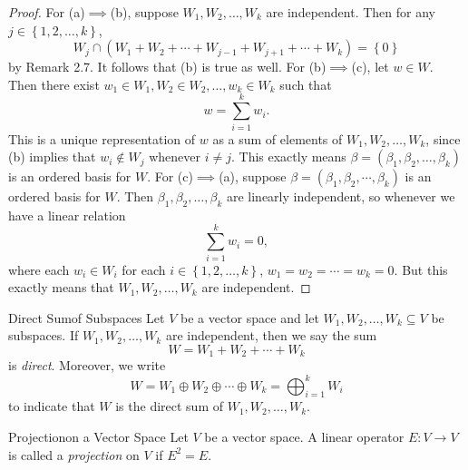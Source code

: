 \documentclass[math_245.tex]{subfiles}
\begin{document}
    \begin{proof}
        For (a)$\implies$(b), suppose $W_1, W_2, \ldots, W_k$ are independent. Then for any $j\in \left\lbrace 1, 2, \ldots, k \right\rbrace$, 
        \begin{equation*}
            W_j\cap \left( W_1+W_2+\cdots+W_{j-1}+W_{j+1}+\cdots+W_k \right) = \left\lbrace 0 \right\rbrace 
        \end{equation*}
        by Remark 2.7. It follows that (b) is true as well. For (b)$\implies$(c), let $w\in W$. Then there exist $w_1\in W_1, W_2\in W_2, \ldots, w_k\in W_k$ such that
        \begin{equation*}
            w = \sum^{k}_{i=1} w_i.
        \end{equation*}
        This is a unique representation of $w$ as a sum of elements of $W_1, W_2, \ldots, W_k$, since (b) implies that $w_i\notin W_j$ whenever $i\neq j$. This exactly means $\beta = \left( \beta_1, \beta_2, \ldots, \beta_k \right)$ is an ordered basis for $W$. For (c)$\implies$(a), suppose $\beta = \left( \beta_1, \beta_2, \cdots, \beta_k \right)$ is an ordered basis for $W$. Then $\beta_1, \beta_2, \ldots, \beta_k$ are linearly independent, so whenever we have a linear
        relation
        \begin{equation*}
            \sum^{k}_{i=1} w_i = 0,
        \end{equation*}
        where each $w_i\in W_i$ for each $i\in \left\lbrace 1, 2, \ldots, k \right\rbrace$, $w_1 = w_2 = \cdots = w_k = 0$. But this exactly means that $W_1, W_2, \ldots, W_k$ are independent.
    \end{proof}

    \begin{definition}{Direct Sum}{of Subspaces}
        Let $V$ be a vector space and let $W_1, W_2, \ldots, W_k\subseteq V$ be subspaces. If $W_1, W_2, \ldots, W_k$ are independent, then we say the sum
        \begin{equation*}
            W = W_1 + W_2 + \cdots + W_k
        \end{equation*}
        is \emph{direct}. Moreover, we write
        \begin{equation*}
            W = W_1\oplus W_2\oplus \cdots\oplus W_k = \bigoplus^{k}_{i=1} W_i
        \end{equation*}
        to indicate that $W$ is the direct sum of $W_1, W_2, \ldots, W_k$.
    \end{definition}

    \begin{definition}{Projection}{on a Vector Space}
        Let $V$ be a vector space. A linear operator $E:V\to V$ is called a \emph{projection} on $V$ if $E^2 = E$.
    \end{definition}
\end{document}
